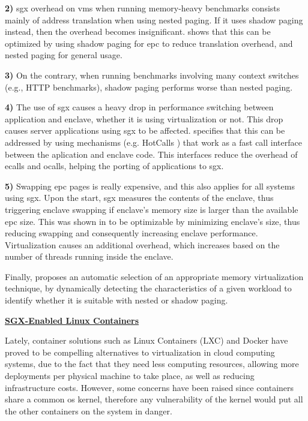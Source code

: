 \textbf{2)} \gls{sgx} overhead on \gls{vm}s when running memory-heavy benchmarks consists mainly of address translation when using nested paging. If it uses shadow paging instead, then the overhead becomes insignificant. 
\cite{sgxVirtualizationPaper} shows that this can be optimized by using shadow paging for \gls{epc} to reduce translation overhead, and nested paging for general usage.

\textbf{3)} On the contrary, when running benchmarks involving many context switches (e.g., HTTP benchmarks), shadow paging performs worse than nested paging.

\textbf{4)} The use of \gls{sgx} causes a heavy drop in performance switching between application and enclave, whether it is using virtualization or not. This drop causes server applications using \gls{sgx} to be affected.
\cite{sgxVirtualizationPaper} specifies that this can be addressed by using mechanisms (e.g. HotCalls \cite{hotcallsPaper}) that work as a fast call interface between the aplication and enclave code. This interfaces reduce the overhead of ecalls and ocalls, helping the porting of applications to \gls{sgx}.

\textbf{5)} Swapping \gls{epc} pages is really expensive, and this also applies for all systems using \gls{sgx}. 
Upon the start, \gls{sgx} measures the contents of the enclave, thus triggering enclave swapping if enclave's memory size is larger than the available \gls{epc} size. 
This was shown in \cite{sgxVirtualizationPaper} to be optimizable by minimizing enclave's size, thus reducing swapping and consequently increasing enclave performance.
Virtualization causes an additional overhead, which increases based on the number of threads running inside the enclave.

Finally, \cite{sgxVirtualizationPaper} proposes an automatic selection of an appropriate memory virtualization technique, by dynamically detecting the characteristics of a given workload to identify whether it is suitable with nested or shadow paging.\newline

\underline{\textbf{SGX-Enabled Linux Containers}}


Lately, container solutions such as Linux Containers (LXC) and Docker have proved to be compelling alternatives to virtualization in cloud computing systems, due to the fact that they need less computing resources, allowing more deployments per physical machine to take place, as well as reducing infrastructure costs. However, some concerns have been raised since containers share a common \gls{os} kernel, therefore any vulnerability of the kernel would put all the other containers on the system in danger.

